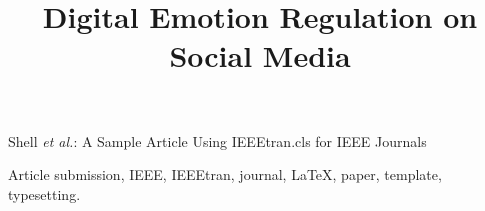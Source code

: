 \documentclass[lettersize,journal]{IEEEtran}
\begin{document}
\title{Digital Emotion Regulation on Social Media}


%
{Shell \MakeLowercase{\textit{et al.}}: A Sample Article Using IEEEtran.cls for IEEE Journals}


\maketitle

\begin{abstract}
\end{abstract}

\begin{IEEEkeywords}
Article submission, IEEE, IEEEtran, journal, \LaTeX, paper, template, typesetting.
\end{IEEEkeywords}
\end{document}
